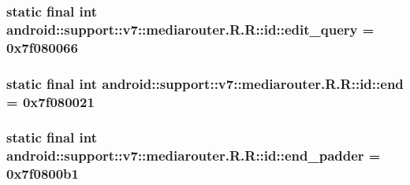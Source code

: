 \hypertarget{classandroid_1_1support_1_1v7_1_1mediarouter_1_1_r_1_1id_cb54924eefb4f0025de8748b580e4ef7}{
\subsubsection[{edit\_\-query}]{\setlength{\rightskip}{0pt plus 5cm}static final int android::support::v7::mediarouter.R.R::id::edit\_\-query = 0x7f080066}}
\label{classandroid_1_1support_1_1v7_1_1mediarouter_1_1_r_1_1id_cb54924eefb4f0025de8748b580e4ef7}


\hypertarget{classandroid_1_1support_1_1v7_1_1mediarouter_1_1_r_1_1id_b6c702dc154237c6ee845a93a8b9adf2}{
\subsubsection[{end}]{\setlength{\rightskip}{0pt plus 5cm}static final int android::support::v7::mediarouter.R.R::id::end = 0x7f080021}}
\label{classandroid_1_1support_1_1v7_1_1mediarouter_1_1_r_1_1id_b6c702dc154237c6ee845a93a8b9adf2}


\hypertarget{classandroid_1_1support_1_1v7_1_1mediarouter_1_1_r_1_1id_e244c47322e0a39eea0d5416031fd135}{
\subsubsection[{end\_\-padder}]{\setlength{\rightskip}{0pt plus 5cm}static final int android::support::v7::mediarouter.R.R::id::end\_\-padder = 0x7f0800b1}}
\label{classandroid_1_1support_1_1v7_1_1mediarouter_1_1_r_1_1id_e244c47322e0a39eea0d5416031fd135}


